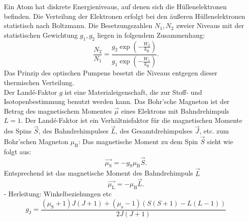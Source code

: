 
Ein Atom hat diskrete Energieniveaus, auf denen sich die Hüllenelektronen befinden.
Die Verteilung der Elektronen erfolgt bei den äußeren Hüllenelektronen statistisch nach Boltzmann.
Die Besetzungszahlen $N_{1}, N_{2}$ zweier Niveaus mit der statistischen Gewichtung $g_{1}, g_{2}$ liegen in folgendem Zusammenhang:
\begin{equation*}
  \frac{N_{2}}{N_{1}} = \frac{ g_{2} \exp{  \left( -\frac{W_{2}}{k_{\text{B}}}  \right) }}{ g_{1} \exp{ \left( -\frac{W_{1}}{k_{\text{B}}} \right) }}.
\end{equation*}
Das Prinzip des optischen Pumpens besetzt die Niveaus entgegen dieser thermischen Verteilung.\\
Der Landé-Faktor $g$ ist eine Materialeigenschaft, die zur Stoff- und Isotopenbestimmung benutzt werden kann.
Das Bohr'sche Magneton ist der Betrag des magnetischem Momentes $\vec{\mu}$ eines Elektrons mit Bahndrehimpuls $L=1$.
Der Landé-Faktor ist ein Verhältnisfaktor für die magnetischen Momente des Spins $\vec{S}$, des Bahndrehimpulses $\vec{L}$, des Gesamtdrehimpulses $\vec{J}$, etc. zum Bohr'schen Magneton $\mu_{\text{B}}$:
Das magnetische Moment zu dem Spin $\vec{S}$ sieht wie folgt aus:
\begin{equation*}
  \vec{\mu_{\text{S}}} = - g_{\text{S}} \mu_{\text{B}} \vec{S}.
\end{equation*}
Entsprechend ist das magnetische Moment des Bahndrehimpuls $\vec{L}$
\begin{equation*}
  \vec{\mu_{\text{L}}} = - \mu_{\text{B}} \vec{L}.
\end{equation*}
- Herleitung: Winkelbeziehungen etc\\
\begin{equation}
  g_{\text{J}}= \frac{\left(\mu_{\text{S}} +1 \right)J\left(J+1\right) + \left(\mu_{\text{s}}-1\right) \left( S\left(S+1\right)-L\left(L-1\right) \right)   }{2J\left(J+1\right)}
\label{eqn:landej}
\end{equation}

